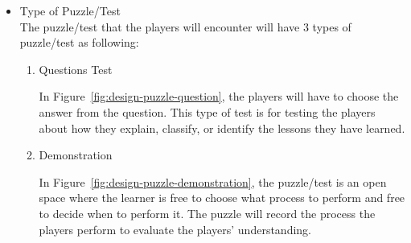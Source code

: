 \documentclass[12pt,oneside,openright,a4paper]{cpe-english-project}
\begin{document}
\begin{itemize}
\begin{enumerate}
\begin{itemize}
		\item Type of Puzzle/Test \\
		The puzzle/test that the players will encounter will have 3 types of puzzle/test as following: 
		\begin{enumerate}
			\item Questions Test \\
			\begin{minipage}[c]{\textwidth}\centering
			\label{fig:design-puzzle-question}
			\end{minipage}
			In Figure~\ref{fig:design-puzzle-question}, the players will have to choose the answer from the question. This type of test is for  testing the players about how they explain, classify, or identify the lessons they have learned.

			\item Demonstration \\
			\begin{minipage}[c]{\textwidth}\centering
			\label{fig:design-puzzle-demonstration}
			\end{minipage}
			In Figure~\ref{fig:design-puzzle-demonstration}, the puzzle/test is an open space where the learner is free to choose what process to perform and free to decide when to perform it. The puzzle will record the process the players perform to evaluate the players’ understanding.


\end{enumerate}
\end{itemize}
\end{enumerate}
\end{itemize}
\end{document}
